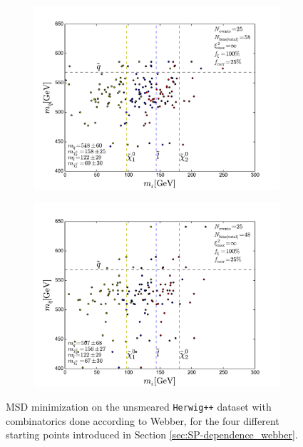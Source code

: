 \documentclass[twoside,english]{uiofysmaster}
\begin{document}
\begin{figure}[hbt]
	\begin{subfigure}[b]{0.45\textwidth}
		\includegraphics[width=\textwidth]{figures/improving_combinatorics/herwigpp-MD-dileptonedge-fit-comb-nosmear-nocut_800-500-300-50.pdf} 
		\caption{ }
	\end{subfigure}
	\begin{subfigure}[b]{0.45\textwidth}
		\includegraphics[width=\textwidth]{figures/improving_combinatorics/herwigpp-MD-dileptonedge-fit-comb-nosmear-nocut_1000-100-80-30.pdf}
		\caption{ } 
	\end{subfigure}
	\caption{MSD minimization on the unsmeared {\tt Herwig++} dataset with combinatorics done according to Webber, for the four different starting points introduced in Section \ref{sec:SP-dependence_webber}.}
	\label{fig:MD_starting_point_sensitivity_combinatorics}
\end{figure}
\end{document}
